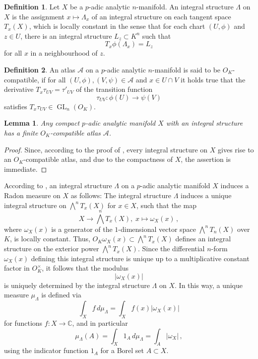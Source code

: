 \documentclass[a4paper,draft]{ZbRad}
\theoremstyle{plain}
\newtheorem{lem}{Lemma}[section]
\theoremstyle{definition}
\newtheorem{dfn}{Definition}[section]
\numberwithin{equation}{section}
\newcommand{\absolute}[1]{\left\lvert#1\right\rvert}
\DeclareMathOperator{\GL}{GL}
\begin{document}
\begin{dfn} Let $X$ be a $p$-adic analytic $n$-manifold. An integral structure $\Lambda$ on $X$ is the assignment $x\mapsto\Lambda_x$ of an integral structure on each tangent
space $T_x(X)$, which is locally constant in the sense that for each chart $(U, \phi)$ and
$z \in U$, there is an integral structure $L_z\subset K^n$ such that
\[
T_x \phi(\Lambda_x) = L_z
\]
for all $x$ in a neighbourhood of $z$.
\end{dfn}

\begin{dfn}
An atlas $\mathcal{A}$ on a $p$-adic analytic $n$-manifold is said to be $O_K$-
compatible, if for all $(U,\phi), (V, \psi) \in\mathcal{A}$ and $x \in U \cap V$ it holds true that the
derivative $T_x \tau_{UV} =\tau'_{UV}$ of the transition function
\[
\tau_{UV}\colon\phi(U) \to \psi(V)
\]
satisfies $T_x \tau_{UV}\in\GL_n(O_K)$.
\end{dfn}

\begin{lem} Any compact $p$-adic analytic manifold $X$ with an integral structure has a finite $O_K$-compatible atlas $\mathcal{A}$.
\end{lem}

\begin{proof}
Since, according to the proof of \cite[Lemma 3.2.6]{BKL2026}, every integral structure on $X$ gives rise to an $O_K$-compatible atlas, and due to the compactness
of $X$, the assertion is immediate.
\end{proof}

According to \cite[Section 3.3]{BKL2026}, an integral structure $\Lambda$ on a $p$-adic analytic manifold $X$ induces a Radon measure on $X$ as follows: The integral structure $\Lambda$ induces a unique integral structure on $\bigwedge^nT_x(X)$ for $x\in X$, such that the map
\[
X\to\bigwedge^nT_x(X),\;
x\mapsto\omega_X(x)\,,
\]
where $\omega_X(x)$ is a generator of the $1$-dimensional vector space $\bigwedge^nT_n(X)$ over $K$,
is locally constant. Thus, $O_K\omega_X(x)\subset\bigwedge^nT_x(X)$ defines an integral structure on the exterior power $\bigwedge^nT_x(X)$. Since the differential $n$-form $\omega_X(x)$ defining this integral structure is unique up to a multiplicative constant factor in $O_K^\times$, it follows that the modulus
\[
\absolute{\omega_X(x)}
\]
is uniquely determined by the integral structure $\Lambda$ on $X$. In this way, a unique measure $\mu_\Lambda$ is defined via
\[
\int_X f\,d\mu_\Lambda=\int_Xf(x)\absolute{\omega_X(x)}
\]
for functions $f\colon X\to\mathbb{C}$, and in particular
\[
\mu_\Lambda(A)=\int_X1_A\,d\mu_\Lambda=\int_A\absolute{\omega_X}\,,
\]
using the indicator function $1_A$
for a Borel set $A\subset X$.
\end{document}

